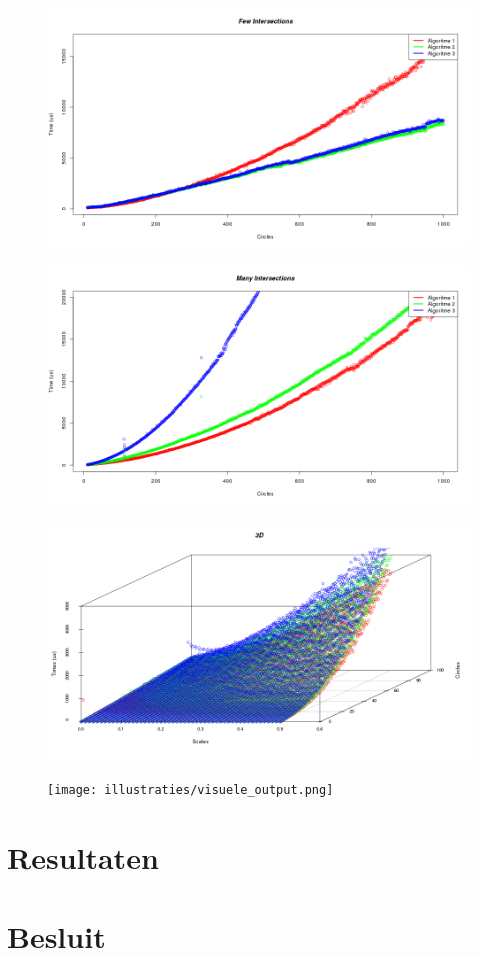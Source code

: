 \documentclass[12pt,a4paper]{article}
\begin{document}
\begin{figure}[H]
  \centering
  \includegraphics[width=1\textwidth]{illustraties/fewIntersections.png}
\end{figure}
\begin{figure}[H]
  \centering
  \includegraphics[width=1\textwidth]{illustraties/manyIntersections.png}
\end{figure}
\begin{figure}[H]
  \centering
  \includegraphics[width=1\textwidth]{illustraties/3DScatter.png}
\end{figure}

\begin{figure}[H]
  \centering
  \texttt{[image: illustraties/visuele\_output.png]}
\end{figure}

\section{Resultaten}

\section{Besluit}

\listoftodos
\end{document}
